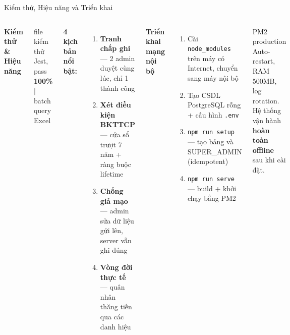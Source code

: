 \documentclass[aspectratio=43,xcolor=table]{beamer}
\begin{document}
\begin{frame}{Kiểm thử, Hiệu năng và Triển khai}
  \begin{columns}[T,onlytextwidth]
    \textbf{Kiểm thử \& Hiệu năng}\\[0.2cm]

    \begin{block}{}
       file kiểm thử Jest, pass \textbf{100\%} \quad $|$  batch query Excel
    \end{block}

    \scriptsize\textbf{4 kịch bản nổi bật:}
    \begin{enumerate}\scriptsize
      \item \textbf{Tranh chấp ghi} --- 2 admin duyệt cùng lúc, chỉ 1 thành công
      \item \textbf{Xét điều kiện BKTTCP} --- cửa sổ trượt 7 năm + ràng buộc lifetime
      \item \textbf{Chống giả mạo} --- admin sửa dữ liệu gửi lên, server vẫn ghi đúng
      \item \textbf{Vòng đời thực tế} --- quân nhân thăng tiến qua các danh hiệu
    \end{enumerate}

    \textbf{Triển khai mạng nội bộ}\\[0.2cm]
    \scriptsize
    \begin{enumerate}
      \item Cài \texttt{node\_modules} trên máy có Internet, chuyển sang máy nội bộ
      \item Tạo CSDL PostgreSQL rỗng + cấu hình \texttt{.env}
      \item \texttt{npm run setup} --- tạo bảng và SUPER\_ADMIN (idempotent)
      \item \texttt{npm run serve} --- build + khởi chạy bằng PM2
    \end{enumerate}

    \begin{block}{PM2 production}
      \scriptsize Auto-restart, RAM 500MB, log rotation. Hệ thống vận hành \textbf{hoàn toàn offline} sau khi cài đặt.
    \end{block}
  \end{columns}
\end{frame}
\end{document}

